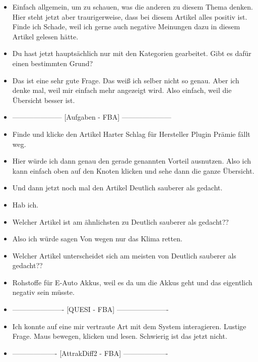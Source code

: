 {\begin{itemize}[]
        \item {} Einfach allgemein, um zu schauen, was die anderen zu diesem Thema denken.
              Hier steht jetzt aber traurigerweise, dass bei diesem Artikel alles positiv ist.
              Finde ich Schade, weil ich gerne auch negative Meinungen dazu in diesem Artikel gelesen hätte.
        \item {} Du hast jetzt hauptsächlich nur mit den Kategorien gearbeitet. Gibt es dafür einen bestimmten Grund?
        \item {} Das ist eine sehr gute Frage.
              Das weiß ich selber nicht so genau.
              Aber ich denke mal, weil mir einfach mehr angezeigt wird.
              Also einfach, weil die Übersicht besser ist.
        \item {---------------------} [Aufgaben - FBA] {---------------------}
        \item {} Finde und klicke den Artikel \flqq Harter Schlag für Hersteller Plugin Prämie fällt weg\frqq{}.
        \item {} Hier würde ich dann genau den gerade genannten Vorteil ausnutzen.
              Also ich kann einfach oben auf den Knoten klicken und sehe dann die ganze Übersicht.
        \item {} Und dann jetzt noch mal den Artikel \flqq Deutlich sauberer als gedacht\frqq{}.
        \item {} Hab ich.
        \item {} Welcher Artikel ist am ähnlichsten zu \flqq Deutlich sauberer als gedacht?\frqq{}?
        \item {} Also ich würde sagen \flqq Von wegen nur das Klima retten\frqq{}.
        \item {} Welcher Artikel unterscheidet sich am meisten von \flqq Deutlich sauberer als gedacht?\frqq{}?
        \item {} \flqq Rohstoffe für E-Auto Akkus\frqq{}, weil es da um die Akkus geht und das eigentlich negativ sein müsste.
        \item {----------------------} [QUESI - FBA] {----------------------}
        \item {} Ich konnte auf eine mir vertraute Art mit dem System interagieren.
              Lustige Frage.
              Maus bewegen, klicken und lesen.
              Schwierig ist das jetzt nicht.
        \item {-------------------} [AttrakDiff2 - FBA] {-------------------}

\end{itemize}}

